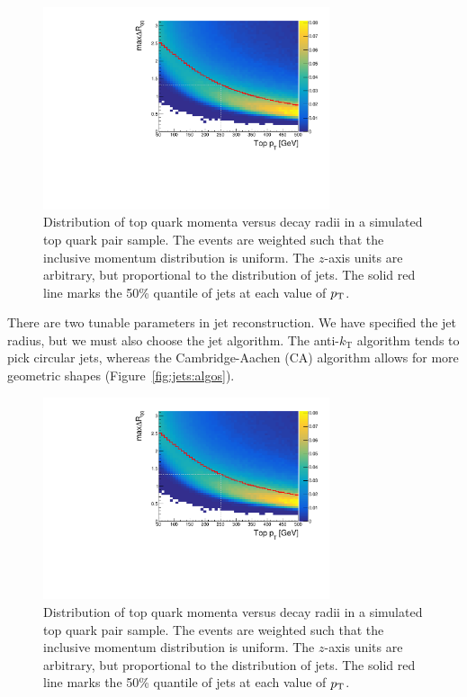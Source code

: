 \begin{figure}[]
    \begin{center}
        \includegraphics[width=0.75\textwidth]{figures/toptagging/gen/ptdr.pdf}
        \caption{Distribution of top quark momenta versus decay radii in a simulated top quark pair sample.
                 The events are weighted such that the inclusive momentum distribution is uniform. 
                 The $z$-axis units are arbitrary, but proportional to the distribution of jets. 
                 The solid red line marks the 50\% quantile of jets at each value of $p_\mathrm{T}$. }
        \label{fig:jets:dr}
    \end{center}
\end{figure}

There are two tunable parameters in jet reconstruction.
We have specified the jet radius, but we must also choose the jet algorithm.
The anti-$k_\mathrm{T}$ algorithm tends to pick circular jets, whereas the Cambridge-Aachen (CA) algorithm allows for more geometric shapes (Figure~\ref{fig:jets:algos}).


\begin{figure}[]
    \begin{center}
        \includegraphics[width=0.75\textwidth]{figures/toptagging/gen/ptdr.pdf}
        \caption{Distribution of top quark momenta versus decay radii in a simulated top quark pair sample.
                 The events are weighted such that the inclusive momentum distribution is uniform. 
                 The $z$-axis units are arbitrary, but proportional to the distribution of jets. 
                 The solid red line marks the 50\% quantile of jets at each value of $p_\mathrm{T}$. }
        \label{fig:jets:dr}
    \end{center}
\end{figure}

